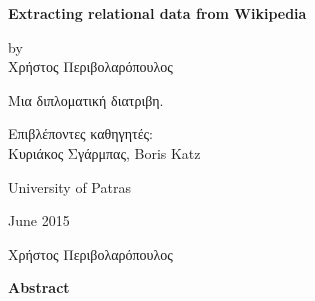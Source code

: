 
\begin{titlepage}
    \begin{center}
        \vspace*{0.15cm}

        \Large
        \textbf{Extracting relational data from Wikipedia}

        \vspace{0.8cm}
        \large{by}\\
        \large
        Χρήστος Περιβολαρόπουλος


        \vspace{2.5cm}

        Μια διπλοματική διατριβη.


        \vspace{2.2cm}
        Επιβλέποντες καθηγητές:\\
        Κυριάκος Σγάρμπας, Boris Katz

        \vspace{4cm}
        \begin{center}
        \end{center}

        \vspace{0.6cm}
        \Large
        University of Patras

        \vspace{0.6cm}
        June 2015
    \end{center}
\end{titlepage}
\clearpage

\thispagestyle{plain}
\vspace*{1in}
\begin{center}
\begin{Large}
\textbf{\title}
\end{Large}

\vspace{0.5cm}
Χρήστος Περιβολαρόπουλος

\vspace{1.6cm}
\begin{large}
\textbf{Abstract}
\end{large}
\end{center}

